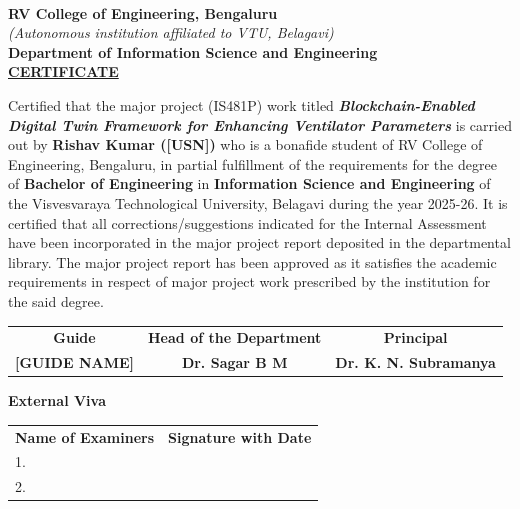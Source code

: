 \documentclass[12pt,a4paper,oneside]{report}
\begin{document}
\thispagestyle{empty}
\begin{center}
{\Large\bfseries RV College of Engineering\textsuperscript{\textregistered}, Bengaluru}\\
\textit{(Autonomous institution affiliated to VTU, Belagavi)}\\
{\large\bfseries Department of Information Science and Engineering}\\[0.5in]
\Huge\textbf{\underline{CERTIFICATE}}
\end{center}
\vspace{0.3in}
\noindent Certified that the major project (IS481P) work titled \textbf{\textit{Blockchain-Enabled Digital Twin Framework for Enhancing Ventilator Parameters}} is carried out by \textbf{Rishav Kumar (\textbf{[USN]})} who is a bonafide student of RV College of Engineering, Bengaluru, in partial fulfillment of the requirements for the degree of \textbf{Bachelor of Engineering} in \textbf{Information Science and Engineering} of the Visvesvaraya Technological University, Belagavi during the year 2025-26. It is certified that all corrections/suggestions indicated for the Internal Assessment have been incorporated in the major project report deposited in the departmental library. The major project report has been approved as it satisfies the academic requirements in respect of major project work prescribed by the institution for the said degree.
\vspace{0.6in}

\begin{center}
\begin{tabular}{ccc}
\textbf{Guide} & \textbf{Head of the Department} & \textbf{Principal}\\[0.5in]
\textbf{[GUIDE NAME]} & \textbf{Dr. Sagar B M} & \textbf{Dr. K. N. Subramanya}
\end{tabular}
\end{center}
\vspace{0.5in}

\begin{center}
\textbf{\Large External Viva}\\[0.2in]
\begin{tabular}{p{2.5in}p{2.5in}}
\textbf{Name of Examiners} & \textbf{Signature with Date}\\[0.3in]
1. & \\[0.3in]
2. & \\
\end{tabular}
\end{center}
\newpage
\end{document}
